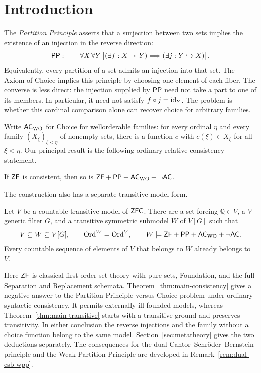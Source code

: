\section{Introduction}\label{sec:introduction}

The \emph{Partition Principle} asserts that a surjection between two sets
implies the existence of an injection in the reverse direction:
\[
 \mathsf{PP}:\qquad
 \forall X\,\forall Y\,
 \bigl[(\exists f:X\twoheadrightarrow Y)
       \Longrightarrow(\exists j:Y\hookrightarrow X)\bigr].
\]
Equivalently, every partition of a set admits an injection into that set.
The Axiom of Choice implies this principle by choosing one element of each
fiber. The converse is less direct: the injection supplied by $\mathsf{PP}$ need
not take a part to one of its members. In particular, it need not satisfy
$f\circ j=\operatorname{id}_Y$. The problem is whether this cardinal comparison alone
can recover choice for arbitrary families.

Write $\mathsf{AC}_{\mathrm{WO}}$ for Choice for wellorderable families: for every ordinal
$\eta$ and every family $(X_\xi)_{\xi<\eta}$ of nonempty sets, there is a
function $c$ with $c(\xi)\in X_\xi$ for all $\xi<\eta$.
Our principal result is the following ordinary relative-consistency statement.

\begin{theorem}\label{thm:main-consistency}
If $\mathsf{ZF}$ is consistent, then so is $\mathsf{ZF}+\mathsf{PP}+\mathsf{AC}_{\mathrm{WO}}+\neg\mathsf{AC}$.
\end{theorem}

The construction also has a separate transitive-model form.

\begin{theorem}\label{thm:main-transitive}
Let $V$ be a countable transitive model of $\mathsf{ZFC}$. There are a set forcing
$\mathbb Q\in V$, a $V$-generic filter $G$, and a transitive symmetric
submodel $W$ of $V[G]$ such that
\[
 V\subseteq W\subseteq V[G],\qquad
 \mathrm{Ord}^W=\mathrm{Ord}^V,\qquad
 W\models\mathsf{ZF}+\mathsf{PP}+\mathsf{AC}_{\mathrm{WO}}+\neg\mathsf{AC}.
\]
Every countable sequence of elements of $V$ that belongs to $W$ already
belongs to $V$.
\end{theorem}

Here $\mathsf{ZF}$ is classical first-order set theory with pure sets, Foundation,
and the full Separation and Replacement schemata.
Theorem~\ref{thm:main-consistency} gives a negative answer to the
Partition Principle versus Choice problem under ordinary syntactic
consistency. It permits externally ill-founded models, whereas
Theorem~\ref{thm:main-transitive} starts with a transitive ground and
preserves transitivity. In either conclusion the reverse injections and
the family without a choice function belong to the same model.
Section~\ref{sec:metatheory} gives the two deductions separately.
The consequences for the dual Cantor--Schr\"oder--Bernstein principle
and the Weak Partition Principle are developed in
Remark~\ref{rem:dual-csb-wpp}.

